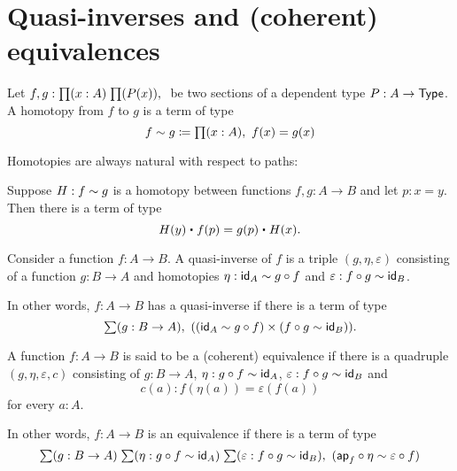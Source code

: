 \section{Quasi-inverses and (coherent) equivalences}
\label{sec:basics-equivalences}

\begin{defn}
Let $f,g:\prd{x:A}{P(x)}$ be two sections of a dependent type $P:A\to\type$. A
homotopy from $f$ to $g$ is a term of type
\begin{equation*}
f\htpy g\defeq \prd{x:A}f(x)=g(x)
\end{equation*}
\end{defn}

Homotopies are always natural with respect to paths:

\begin{lem}\label{lem:htpy_natural}
Suppose $H:f\htpy g$ is a homotopy between functions $f,g:A\to B$
 and let $p:x=y$. Then there is a term of type
 \begin{equation*}
 H(y)\ct\ap{f}{p}=\ap{g}{p}\ct H(x).
 \end{equation*}
\end{lem}

\begin{defn}
Consider a function $f:A\to B$. A quasi-inverse of $f$ is a triple 
$(g,\eta,\varepsilon)$ consisting of a function $g:B\to A$ and homotopies
$\eta:\idfunc[A]\htpy g\circ f$ and $\varepsilon:f\circ g\htpy \idfunc[B]$.
\end{defn}

\begin{rm}
In other words, $f:A\to B$ has a quasi-inverse if there is a term of type
\begin{equation*}
\sm{g:B\to A}((\idfunc[A]\htpy g\circ f)\times(f\circ g\htpy\idfunc[B])).
\end{equation*}
\end{rm}

\begin{defn}
A function $f:A\to B$ is said to be a (coherent) equivalence if there is a
quadruple $(g,\eta,\varepsilon,c)$ consisting of $g:B\to A$, $\eta:
g\circ f\htpy\idfunc[A]$, $\varepsilon: f\circ g\htpy\idfunc[B]$ and
\begin{equation*}
c(a):f(\eta(a))=\varepsilon(f(a))
\end{equation*}
for every $a:A$. 
\end{defn}

\begin{rm}
In other words, $f:A\to B$ is an equivalence if there is a term of type
\begin{equation*}
\sm{g:B\to A}{\eta:g\circ f\htpy\idfunc[A]}
{\varepsilon:f\circ g\htpy \idfunc[B]}(\apfunc{f}\circ\eta\htpy\varepsilon
\circ f)
\end{equation*}
\end{rm}

